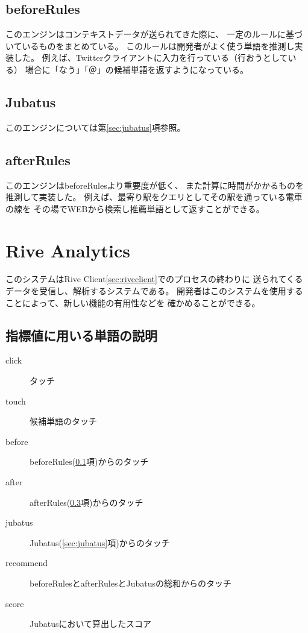 \subsection{beforeRules}
\label{sec:beforerules}
このエンジンはコンテキストデータが送られてきた際に、
一定のルールに基づいているものをまとめている。
このルールは開発者がよく使う単語を推測し実装した。
例えば、Twitter\cite{twitter}クライアントに入力を行っている（行おうとしている）
場合に「なう」「＠」の候補単語を返すようになっている。

\subsection{Jubatus}
このエンジンについては第\ref{sec:jubatus}項参照。

\subsection{afterRules}
\label{sec:afterrules}
このエンジンはbeforeRulesより重要度が低く、
また計算に時間がかかるものを推測して実装した。
例えば、最寄り駅をクエリとしてその駅を通っている電車の線を
その場でWEBから検索し推薦単語として返すことができる。

\section{Rive Analytics}
このシステムはRive Client\ref{sec:riveclient}でのプロセスの終わりに
送られてくるデータを受信し、解析するシステムである。
開発者はこのシステムを使用することによって、新しい機能の有用性などを
確かめることができる。
\subsection{指標値に用いる単語の説明}
\begin{description}
  \item[click] タッチ
  \item[touch] 候補単語のタッチ
  \item[before] beforeRules(\ref{sec:beforerules}項)からのタッチ
  \item[after] afterRules(\ref{sec:afterrules}項)からのタッチ
  \item[jubatus] Jubatus(\ref{sec:jubatus}項)からのタッチ
  \item[recommend] beforeRulesとafterRulesとJubatusの総和からのタッチ
  \item[score] Jubatusにおいて算出したスコア
\end{description}
